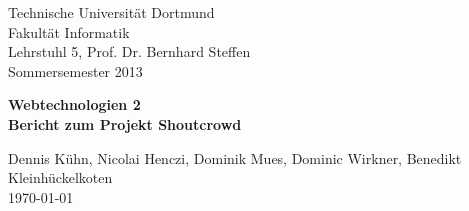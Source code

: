 \begin{titlepage}
\begin{small}
\vfill {Technische Universit\"at Dortmund\\ 
Fakult\"at Informatik\\
Lehrstuhl 5, Prof. Dr. Bernhard Steffen \\
Sommersemester 2013}
\end{small}


\begin{center}
\begin{Large}
\vfill {\textsf{\textbf{
Webtechnologien 2 \\
Bericht zum Projekt Shoutcrowd
}}}
\end{Large}
\end{center}

\begin{small}
\vfill Dennis Kühn, Nicolai Henczi, Dominik Mues, Dominic Wirkner, Benedikt Kleinhückelkoten\\ 
\today
\end{small}

\end{titlepage}
